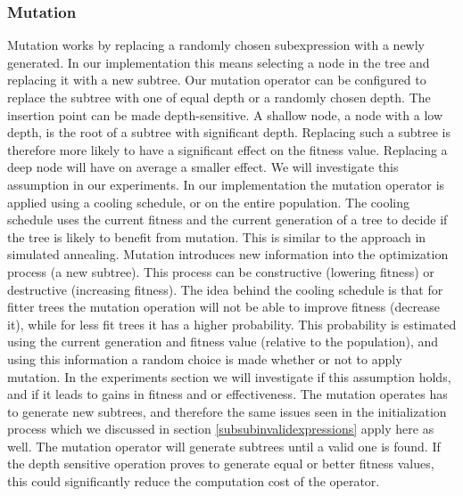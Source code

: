 \subsubsection{Mutation}
Mutation works by replacing a randomly chosen subexpression with a newly generated. In our implementation this means selecting a node in the tree and replacing it with a new subtree. Our mutation operator can be configured to replace the subtree with one of equal depth or a randomly chosen depth. The insertion point can be made depth-sensitive. A shallow node, a node with a low depth, is the root of a subtree with significant depth. Replacing such a subtree is therefore more likely to have a significant effect on the fitness value. Replacing a deep node will have on average a smaller effect. We will investigate this assumption in our experiments.
In our implementation the mutation operator is applied using a cooling schedule, or on the entire population. 
The cooling schedule uses the current fitness and the current generation of a tree to decide if the tree is likely to benefit from mutation. This is similar to the approach in simulated annealing.
Mutation introduces new information into the optimization process (a new subtree). This process can be constructive (lowering fitness) or destructive (increasing fitness). The idea behind the cooling schedule is that for fitter trees the mutation operation will not be able to improve fitness (decrease it), while for less fit trees it has a higher probability. 
This probability is estimated using the current generation and fitness value (relative to the population), and using this information a random choice is made whether or not to apply mutation. In the experiments section we will investigate if this assumption holds, and if it leads to gains in fitness and or effectiveness.
The mutation operates has to generate new subtrees, and therefore the same issues seen in the initialization process which we discussed in section \ref{subsubinvalidexpressions} apply here as well. The mutation operator will generate subtrees until a valid one is found. If the depth sensitive operation proves to generate equal or better fitness values, this could significantly reduce the computation cost of the operator.

